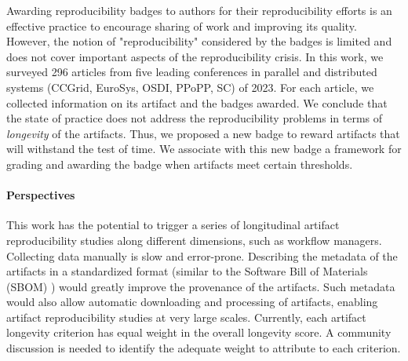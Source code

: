 \documentclass[sigconf,natbib=false]{acmart}
\newcommand{\eg}{\emph{e.g.,}}
\begin{document}
Awarding reproducibility badges to authors for their reproducibility efforts is an effective practice to encourage sharing of work and improving its quality.
However, the notion of "reproducibility" considered by the badges is limited and does not cover important aspects of the reproducibility crisis.
In this work, we surveyed 296 articles from five leading conferences in parallel and distributed systems (CCGrid, EuroSys, OSDI, PPoPP, SC) of 2023.
For each article, we collected information on its artifact and the badges awarded.
We conclude that the state of practice does not address the reproducibility problems in terms of \emph{longevity} of the artifacts.
Thus, we proposed a new badge to reward artifacts that will withstand the test of time.
We associate with this new badge a framework for grading and awarding the badge when artifacts meet certain thresholds.

\paragraph{Perspectives}

This work has the potential to trigger a series of longitudinal artifact reproducibility studies along different dimensions, such as workflow managers.
Collecting data manually is slow and error-prone.
Describing the metadata of the artifacts in a standardized format (similar to the Software Bill of Materials (SBOM) \cite{sbom, xia2023empirical}) would greatly improve the provenance of the artifacts.
Such metadata would also allow automatic downloading and processing of artifacts, enabling artifact reproducibility studies at very large scales.
Currently, each artifact longevity criterion has equal weight in the overall longevity score. 
A community discussion is needed to identify the adequate weight to attribute to each criterion. 
\end{document}
